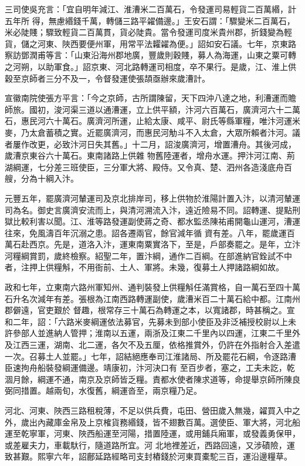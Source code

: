 \begin{pinyinscope}
 三司使吳充言：「宜自明年減江、淮漕米二百萬石，令發運司易輕貨二百萬緡，計五年所
 得，無慮緡錢千萬，轉儲三路平糴備邊。」王安石謂：「驟變米二百萬石，米必陡賤；驟致輕貨二百萬貫，貨必陡貴。當令發運司度米貴州郡，折錢變為輕貨，儲之河東、陜西要便州軍，用常平法糶糴為便。」詔如安石議。七年，京東路察訪鄧潤甫等言：「山東沿海州郡地廣，豐歲則穀賤，募人為海運，山東之粟可轉之河朔，以助軍食。」詔京東、河北路轉運司相度，卒不果行。是歲，江、淮上供穀至京師者三分不及一，令督發運使張頡亟辦來歲漕計。



 宣徽南院使張方平言：「今之京師，古所謂陳留，天下四沖八達之地，利漕運而贍師旅。國初，浚河渠三道以通漕運，立上供平額，汴河六百萬石，廣濟河六十二萬石，惠民河六十萬石。廣濟河所運，止給太康、咸平、尉氏等縣軍糧，唯汴河運米麥，乃太倉蓄積之實。近罷廣濟河，而惠民河觔斗不入太倉，大眾所賴者汴河。議者屢作改更，必致汴河日失其舊。」十二月，詔浚廣濟河，增置漕舟。其後河成，歲漕京東谷六十萬石。東南諸路上供雜
 物舊陸運者，增舟水運。押汴河江南、荊湖綱運，七分差三班使臣，三分軍大將、殿侍。又令真、楚、泗州各造淺底舟百艘，分為十綱入汴。



 元豐五年，罷廣濟河輦運司及京北排岸司，移上供物於淮陽計置入汴，以清河輦運司為名。御史言廣濟安流而上，與清河溯流入汴，遠近險易不同。詔轉運、提點刑獄比較利害以聞。江、淮等路發運副使蔣之奇、都水監丞陳祐甫開龜山運河，漕運往來，免風濤百年沉溺之患。詔各遷兩官，餘官減年循
 資有差。八年，罷歲運百萬石赴西京。先是，道洛入汴，運東南粟實洛下，至是，戶部奏罷之。是年，立汴河糧綱賞罰，歲終檢察。紹聖二年，置汴綱，通作二百綱。在部進納官銓試不中者，注押上供糧斛，不用衙前、土人、軍將。未幾，復募土人押諸路綱如故。



 政和七年，立東南六路州軍知州、通判裝發上供糧斛任滿賞格，自一萬石至四十萬石升名次減年有差。張根為江南西路轉運副使，歲漕米百二十萬石給中都。江南州郡僻遠，官吏艱於
 督趣，根常存三十萬石為轉運之本，以寬諸郡，時甚稱之。宣和二年，詔：「六路米麥綱運依法募官，先募未到部小使臣及非泛補授校尉以上未許參部人並進納人管押；淮南以五運，兩浙及江東二千里內以四運，江東二千里外及江西三運，湖南、北二運，各欠不及五厘，依格推賞外，仍許在外指射合入差遣一次。召募土人並罷。」七年，詔結絕應奉司江淮諸局、所及罷花石綱，令逐路漕臣速拘舟船裝發綱運備邊。靖康初，汴河決口有
 至百步者，塞之，工夫未訖，乾涸月餘，綱運不通，南京及京師皆乏糧。責都水使者陳求道等，命提舉京師所陳良弼同措置。越兩旬，水復舊，綱運沓至，兩京糧乃足。



 河北、河東、陜西三路租稅薄，不足以供兵費，屯田、營田歲入無幾，糴買入中之外，歲出內藏庫金帛及上京榷貨務緡錢，皆不翅數百萬。選使臣、軍大將，河北船運至乾寧軍，河東、陜西船運至河陽，措置陸運，或用鋪兵廂軍，或發義勇保甲，或差雇夫力，車載馱行，隨道路所宜。河
 北地裡差近，西路回遠，又涉磧險，運致甚艱。熙寧六年，詔鄜延路經略司支封樁錢於河東買橐駝三百，運沿邊糧草。




\end{pinyinscope}
